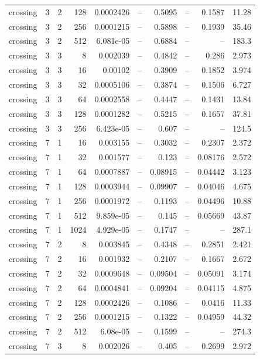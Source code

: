 \begin{tabular}{lrrrrrrrrr}
crossing & 3 & 2 & 128 & 0.0002426 & -- & 0.5095 & -- & 0.1587 & 11.28 \\
crossing & 3 & 2 & 256 & 0.0001215 & -- & 0.5898 & -- & 0.1939 & 35.46 \\
crossing & 3 & 2 & 512 & 6.081e-05 & -- & 0.6884 & -- & -- & 183.3 \\
crossing & 3 & 3 & 8 & 0.002039 & -- & 0.4842 & -- & 0.286 & 2.973 \\
crossing & 3 & 3 & 16 & 0.00102 & -- & 0.3909 & -- & 0.1852 & 3.974 \\
crossing & 3 & 3 & 32 & 0.0005106 & -- & 0.3874 & -- & 0.1506 & 6.727 \\
crossing & 3 & 3 & 64 & 0.0002558 & -- & 0.4447 & -- & 0.1431 & 13.84 \\
crossing & 3 & 3 & 128 & 0.0001282 & -- & 0.5215 & -- & 0.1657 & 37.81 \\
crossing & 3 & 3 & 256 & 6.423e-05 & -- & 0.607 & -- & -- & 124.5 \\
crossing & 7 & 1 & 16 & 0.003155 & -- & 0.3032 & -- & 0.2307 & 2.372 \\
crossing & 7 & 1 & 32 & 0.001577 & -- & 0.123 & -- & 0.08176 & 2.572 \\
crossing & 7 & 1 & 64 & 0.0007887 & -- & 0.08915 & -- & 0.04442 & 3.123 \\
crossing & 7 & 1 & 128 & 0.0003944 & -- & 0.09907 & -- & 0.04046 & 4.675 \\
crossing & 7 & 1 & 256 & 0.0001972 & -- & 0.1193 & -- & 0.04496 & 10.88 \\
crossing & 7 & 1 & 512 & 9.859e-05 & -- & 0.145 & -- & 0.05669 & 43.87 \\
crossing & 7 & 1 & 1024 & 4.929e-05 & -- & 0.1747 & -- & -- & 287.1 \\
crossing & 7 & 2 & 8 & 0.003845 & -- & 0.4348 & -- & 0.2851 & 2.421 \\
crossing & 7 & 2 & 16 & 0.001932 & -- & 0.2107 & -- & 0.1667 & 2.672 \\
crossing & 7 & 2 & 32 & 0.0009648 & -- & 0.09504 & -- & 0.05091 & 3.174 \\
crossing & 7 & 2 & 64 & 0.0004841 & -- & 0.09204 & -- & 0.04115 & 4.875 \\
crossing & 7 & 2 & 128 & 0.0002426 & -- & 0.1086 & -- & 0.0416 & 11.33 \\
crossing & 7 & 2 & 256 & 0.0001215 & -- & 0.1322 & -- & 0.04959 & 44.32 \\
crossing & 7 & 2 & 512 & 6.08e-05 & -- & 0.1599 & -- & -- & 274.3 \\
crossing & 7 & 3 & 8 & 0.002026 & -- & 0.405 & -- & 0.2699 & 2.972 \\

\end{tabular}
